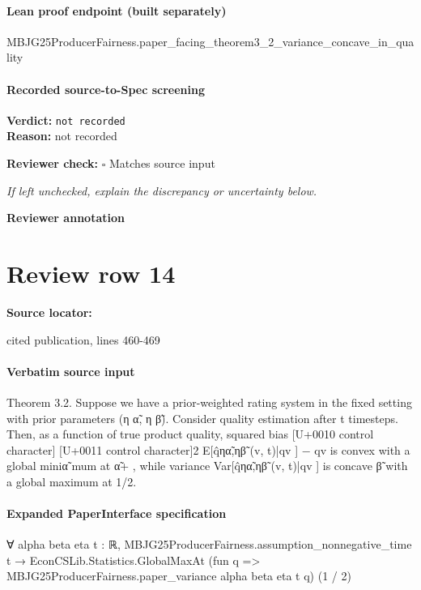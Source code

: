 \documentclass[10pt]{article}
\newcommand{\reviewerbox}{%
  \par\noindent\fbox{\parbox{0.96\linewidth}{\rule{0pt}{0.38in}}}\par
}
\newcommand{\reviewmatch}[1]{%
  \par\noindent\textbf{Reviewer check:} $\square$\; #1\par
  \noindent\emph{If left unchecked, explain the discrepancy or uncertainty below.}\par
}
\begin{document}
\paragraph{Lean proof endpoint (built separately)}\begin{ReviewVerbatim}
MBJG25ProducerFairness.paper_facing_theorem3_2_variance_concave_in_quality
\end{ReviewVerbatim}

\paragraph{Recorded source-to-Spec screening}
\textbf{Verdict:} \texttt{not recorded}
\\
\textbf{Reason:} not recorded
\reviewmatch{Matches source input}
\noindent\textbf{Reviewer annotation}\par
\reviewerbox
\clearpage
\hypertarget{source-claim-a4656e58047f308c}{}
\section*{Review row 14}
\textbf{Source locator:} {\footnotesize\raggedright cited publication, lines 460-\allowbreak{}469\par}
\paragraph{Verbatim source input}
\begin{ReviewVerbatim}
Theorem 3.2. Suppose we have a prior-weighted rating system in the fixed setting with prior parameters (η α̃, η β̃). Consider quality estimation after t timesteps.
Then, as a function of true product quality, squared bias
[U+0010 control character]
[U+0011 control character]2
E[q̂ηα̃,ηβ̃ (v, t)|qv ] − qv
is convex with a global miniα̃
mum at α̃+
, while variance Var[q̂ηα̃,ηβ̃ (v, t)|qv ] is concave
β̃
with a global maximum at 1/2.
\end{ReviewVerbatim}


\paragraph{Expanded PaperInterface specification}
\begin{ReviewVerbatim}
∀ {alpha beta eta t : ℝ},
  MBJG25ProducerFairness.assumption_nonnegative_time t →
    EconCSLib.Statistics.GlobalMaxAt (fun q => MBJG25ProducerFairness.paper_variance alpha beta eta t q) (1 / 2)
\end{ReviewVerbatim}
\end{document}

